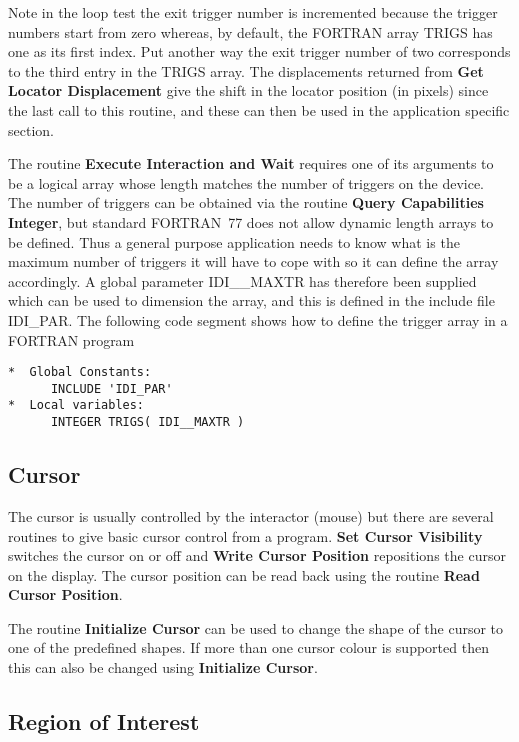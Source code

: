Note in the loop test the exit trigger number is incremented because
the trigger numbers start from zero whereas, by default, the FORTRAN
array TRIGS has one as its first index. Put another way the exit
trigger number of two corresponds to the third entry in the TRIGS array.
The displacements returned from {\bf Get Locator Displacement} give the
shift in the locator position (in pixels) since the last call to this
routine, and these can then be used in the application specific section.

The routine {\bf Execute Interaction and Wait} requires one of
its arguments to be a logical array whose length matches the number of
triggers on the device. The number of triggers can be obtained via the
routine {\bf Query Capabilities Integer}, but standard FORTRAN~77 does not
allow dynamic length arrays to be defined. Thus a general purpose
application needs to know what is the maximum number of triggers it
will have to cope with so it can define the array accordingly. A global
parameter IDI\_\_MAXTR has therefore been supplied which can be used to
dimension the array, and this is defined in the include file IDI\_PAR.
The following code segment shows how to define the trigger array in a
FORTRAN program
\begin{small}
\begin{verbatim}
*  Global Constants:
      INCLUDE 'IDI_PAR'
*  Local variables:
      INTEGER TRIGS( IDI__MAXTR )
\end{verbatim}
\end{small}

\subsection{Cursor}

The cursor is usually controlled by the interactor (mouse) but there are
several routines to give basic cursor control from a program. {\bf Set Cursor
Visibility} switches the cursor on or off and {\bf Write Cursor Position}
repositions the cursor on the display. The cursor position can be read
back using the routine {\bf Read Cursor Position}.

The routine {\bf Initialize Cursor} can be used to change the shape of the
cursor to one of the predefined shapes. If more than one cursor colour is
supported then this can also be changed using {\bf Initialize Cursor}.

\subsection{Region of Interest}

